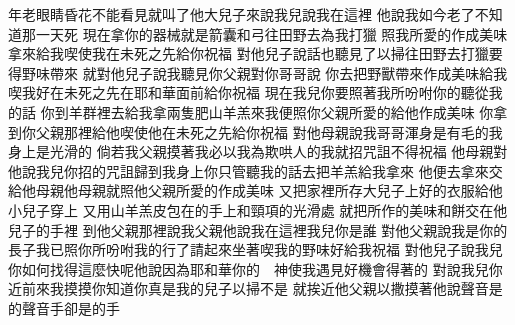 \bchapter%
年老\chientien 眼睛昏花\chientien 不能看見\chientien 就叫了他大兒子來\chientien 說\chientien 我兒\chientien{}說\chientien 我在這裡\chuan 
{}他說\chientien 我如今老了\chientien 不知道那一天死\chuan 
{}現在拿你的器械\chientien 就是箭囊\chientien 和弓\chientien 往田野去為我打獵\yuentien 
{}照我所愛的作成美味\chientien 拿來給我喫\chientien 使我在未死之先\chientien 給你祝福\chuan\Chuan
{}對他兒子說話\chientien{}也聽見了\chuan 以掃往田野去打獵\chientien 要得野味帶來\chuan 
{}就對他兒子說\chientien 我聽見你父親對你哥哥說\chientien 
{}你去把野獸帶來\chientien 作成美味給我喫\chientien 我好在未死之先\chientien 在耶和華面前給你祝福\chuan
{}現在我兒\chientien 你要照著我所吩咐你的\chientien 聽從我的話\chuan 
{}你到羊群裡去\chientien 給我拿兩隻肥山羊羔來\chientien 我便照你父親所愛的\chientien 給他作成美味\chuan 
{}你拿到你父親那裡給他喫\chientien 使他在未死之先\chientien 給你祝福\chuan 
{}對他母親說\chientien 我哥哥渾身是有毛的\chientien 我身上是光滑的\yuentien 
{}倘若我父親摸著我\chientien 必以我為欺哄人的\chientien 我就招咒詛\chientien 不得祝福\chuan 
{}他母親對他說\chientien 我兒\chientien 你招的咒詛歸到我身上\chientien 你只管聽我的話\chientien 去把羊羔給我拿來\chuan 
{}他便去拿來\chientien 交給他母親\chientien 他母親就照他父親所愛的\chientien 作成美味\chuan 
{}又把家裡所存大兒子上好的衣服\chientien 給他小兒子穿上\chuan 
{}又用山羊羔皮\chientien 包在的手上\chientien 和頸項的光滑處\yuentien 
{}就把所作的美味和餅\chientien 交在他兒子的手裡\chuan\Chuan
{}到他父親那裡說\chientien 我父親\chientien 他說\chientien 我在這裡\chientien 我兒\chientien 你是誰\chuan 
{}對他父親說\chientien 我是你的長子\chientien 我已照你所吩咐我的行了\yuentien 請起來坐著\chientien 喫我的野味\chientien 好給我祝福\chuan 
{}對他兒子說\chientien 我兒\chientien 你如何找得這麼快呢\yuentien 他說\chientien 因為耶和華你的　神使我遇見好機會得著的\chuan 
{}對說\chientien 我兒\chientien 你近前來\chientien 我摸摸你\chientien 知道你真是我的兒子以掃不是\chuan 
{}就挨近他父親\yuentien 以撒摸著他說\chientien 聲音是的聲音\chientien 手卻是的手\chuan 
